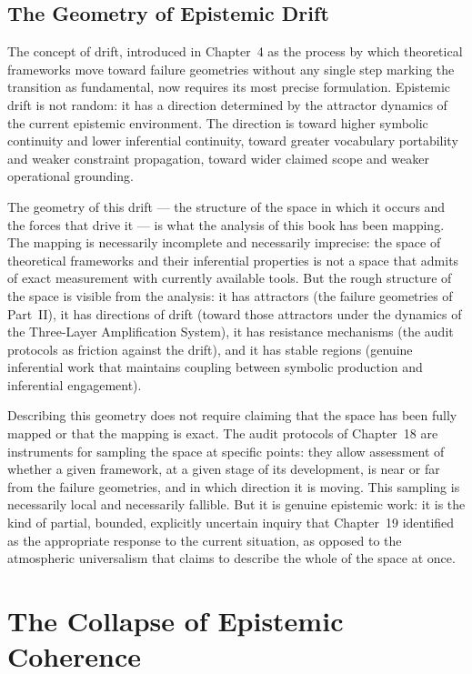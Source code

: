 \documentclass[12pt, openright, twoside]{book}
\begin{document}
\section{The Geometry of Epistemic Drift}

The concept of drift, introduced in Chapter~4 as the process by which
theoretical frameworks move toward failure geometries without any single
step marking the transition as fundamental, now requires its most
precise formulation. Epistemic drift is not random: it has a direction
determined by the attractor dynamics of the current epistemic environment.
The direction is toward higher symbolic continuity and lower inferential
continuity, toward greater vocabulary portability and weaker constraint
propagation, toward wider claimed scope and weaker operational grounding.

The geometry of this drift --- the structure of the space in which it
occurs and the forces that drive it --- is what the analysis of this book
has been mapping. The mapping is necessarily incomplete and necessarily
imprecise: the space of theoretical frameworks and their inferential
properties is not a space that admits of exact measurement with currently
available tools. But the rough structure of the space is visible from
the analysis: it has attractors (the failure geometries of Part~II),
it has directions of drift (toward those attractors under the dynamics
of the Three-Layer Amplification System), it has resistance mechanisms
(the audit protocols as friction against the drift), and it has stable
regions (genuine inferential work that maintains coupling between symbolic
production and inferential engagement).

Describing this geometry does not require claiming that the space has
been fully mapped or that the mapping is exact. The audit protocols of
Chapter~18 are instruments for sampling the space at specific points:
they allow assessment of whether a given framework, at a given stage of
its development, is near or far from the failure geometries, and in
which direction it is moving. This sampling is necessarily local and
necessarily fallible. But it is genuine epistemic work: it is the kind
of partial, bounded, explicitly uncertain inquiry that Chapter~19
identified as the appropriate response to the current situation, as
opposed to the atmospheric universalism that claims to describe the
whole of the space at once.

\chapter{The Collapse of Epistemic Coherence}
\end{document}
